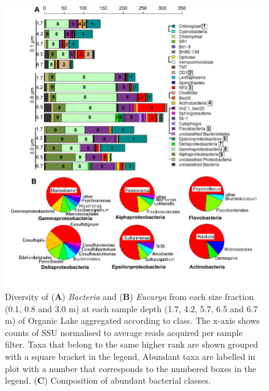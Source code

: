 \begin{figure}
\includegraphics[width=\textwidth]{orglake_figures/genus_barplots3_1.pdf}
\caption[Diversity of \emph{Bacteria} and \emph{Eucarya} in Organic Lake]{Diversity of (\textbf{A}) \emph{Bacteria} and (\textbf{B}) \emph{Eucarya} from each size fraction (0.1, 0.8 and 3.0 \textmu{}m) at each sample depth (1.7, 4.2, 5.7, 6.5 and 6.7 m) of Organic Lake aggregated according to class. The x-axis shows counts of \ac{SSU} normalised to average reads acquired per sample filter. Taxa that belong to the same higher rank are shown grouped with a square bracket in the legend. Abundant taxa are labelled in plot with a number that corresponds to the numbered boxes in the legend. (\textbf{C}) Composition of abundant bacterial classes.}
\label{fig:genus_barplots}

\end{figure}
